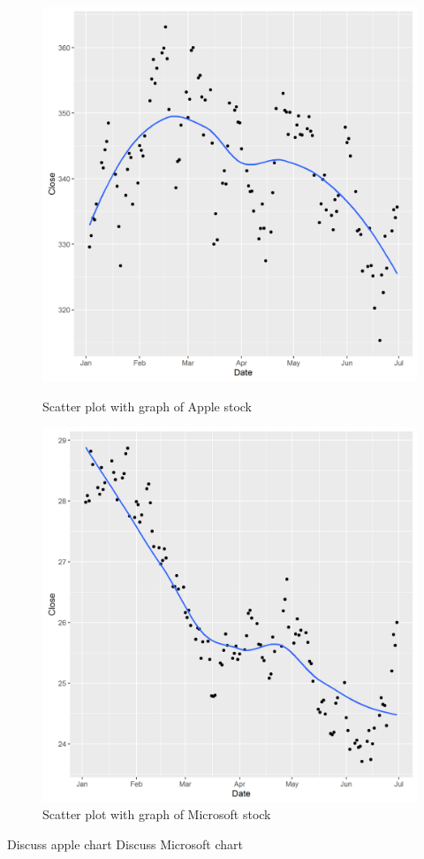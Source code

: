 \documentclass[paper=a4, fontsize=11pt]{scrartcl} %
\numberwithin{equation}{section} %
\numberwithin{figure}{section} %
\numberwithin{table}{section} %
\begin{document}
\begin{figure}[!htb]
  \includegraphics[width=\linewidth]{graph/AAPL1.png}
  \caption{Scatter plot with graph of Apple stock}
\endminipage\hfill
{}
  \includegraphics[width=\linewidth]{graph/MSFT1.png}
  \caption{Scatter plot with graph of Microsoft stock}
\endminipage\hfill

\end{figure}
Discuss apple chart
Discuss Microsoft chart
\end{document}
